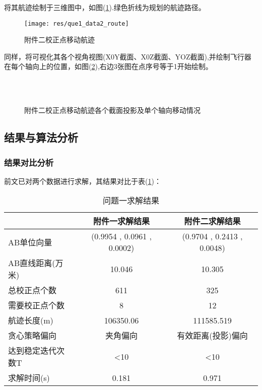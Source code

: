 将其航迹绘制于三维图中，如图(\ref{fig:res-qu1-2}).\figcolor 绿色折线为规划的航迹路径。
\begin{figure}[htbp!]
    \centering
    \texttt{[image: res/que1\_data2\_route]}
    \caption{附件二校正点移动航迹}
    \label{fig:res-qu1-2}
\end{figure}

同样，将可视化其各个视角视图(X0Y截面、X0Z截面、YOZ截面),并绘制飞行器在每个轴向上的位置，如图(\ref{fig:res-qu1-2-add}),\shuoming 右边3张图在点序号等于1开始绘制。
\newpage
\begin{figure}[!htbp]
	\centering
	 \quad
	 \\
     \quad
	 \\
     \quad
	\caption{附件二校正点移动航迹各个截面投影及单个轴向移动情况}
	\label{fig:res-qu1-2-add}
\end{figure}

\subsection{结果与算法分析}
\subsubsection{结果对比分析}
前文已对两个数据进行求解，其结果对比于表(\ref{tab:qu1-res-all})：
\begin{table}[!htbp]
	\caption{问题一求解结果} 
	\label{tab:qu1-res-all}
	\centering
	\begin{tabular}{lcc} 
		\toprule[1.5pt] 
        & 附件一求解结果       & 附件二求解结果       \\
        \midrule[1pt] 
        AB单位向量     & (0.9954 , 0.0961 , 0.0002) & (0.9704 , 0.2413 , 0.0048) \\
        AB直线距离(万米) & 10.046                     & 10.305                     \\
        总校正点个数     & 611                        & 325                        \\
        需要校正点个数    & 8                          & 12                         \\
        航迹长度(m)    & 106350.06                  & 111585.519                 \\
        贪心策略偏向     & 夹角偏向                       & 有效距离(投影)偏向                 \\
        达到稳定迭代次数T  & \textless{}10              & \textless{}10              \\
        求解时间(s)    & 0.181                      & 0.971    \\     
		\bottomrule[1.5pt] 
\end{tabular}\end{table}

